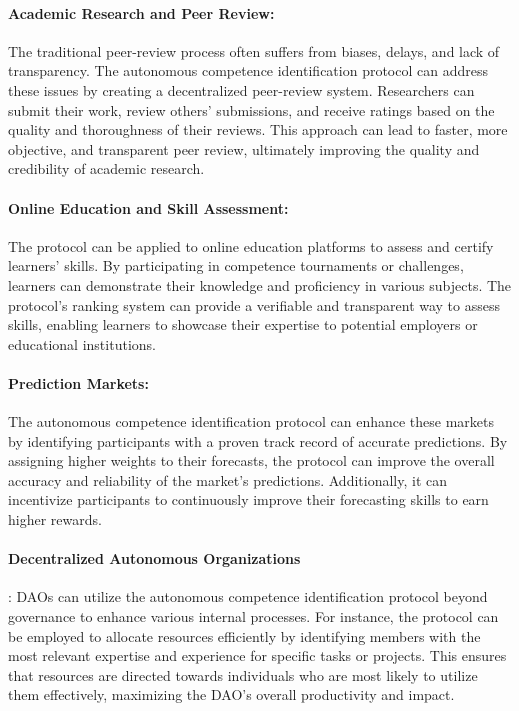 \documentclass{article}
\begin{document}
\begin{CJK}{UTF8}{gbsn}
\begin{multicols}{2}
        \paragraph*{Academic Research and Peer Review:} The traditional peer-review process often suffers from biases, delays, and lack of transparency. The autonomous competence identification protocol can address these issues by creating a decentralized peer-review system. Researchers can submit their work, review others' submissions, and receive ratings based on the quality and thoroughness of their reviews. This approach can lead to faster, more objective, and transparent peer review, ultimately improving the quality and credibility of academic research.

        \paragraph*{Online Education and Skill Assessment:} The protocol can be applied to online education platforms to assess and certify learners' skills. By participating in competence tournaments or challenges, learners can demonstrate their knowledge and proficiency in various subjects. The protocol's ranking system can provide a verifiable and transparent way to assess skills, enabling learners to showcase their expertise to potential employers or educational institutions.

        \paragraph*{Prediction Markets:} The autonomous competence identification protocol can enhance these markets by identifying participants with a proven track record of accurate predictions. By assigning higher weights to their forecasts, the protocol can improve the overall accuracy and reliability of the market's predictions. Additionally, it can incentivize participants to continuously improve their forecasting skills to earn higher rewards.

        \paragraph*{Decentralized Autonomous Organizations}: DAOs can utilize the autonomous competence identification protocol beyond governance to enhance various internal processes. For instance, the protocol can be employed to allocate resources efficiently by identifying members with the most relevant expertise and experience for specific tasks or projects. This ensures that resources are directed towards individuals who are most likely to utilize them effectively, maximizing the DAO's overall productivity and impact.


\end{multicols}
\end{CJK}
\end{document}
